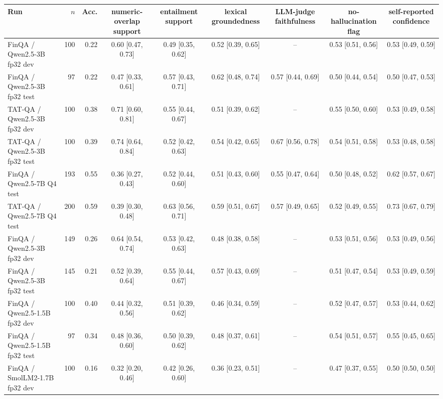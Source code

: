 \begin{tabular}{@{}l r r cccccc@{}}
\toprule
Run & $n$ & Acc. & numeric-overlap support & entailment support & lexical groundedness & LLM-judge faithfulness & no-hallucination flag & self-reported confidence \\
\midrule
FinQA / Qwen2.5-3B fp32 dev & 100 & 0.22 & 0.60 \small[0.47, 0.73] & 0.49 \small[0.35, 0.62] & 0.52 \small[0.39, 0.65] & -- & 0.53 \small[0.51, 0.56] & 0.53 \small[0.49, 0.59] \\
FinQA / Qwen2.5-3B fp32 test & 97 & 0.22 & 0.47 \small[0.33, 0.61] & 0.57 \small[0.43, 0.71] & 0.62 \small[0.48, 0.74] & 0.57 \small[0.44, 0.69] & 0.50 \small[0.44, 0.54] & 0.50 \small[0.47, 0.53] \\
TAT-QA / Qwen2.5-3B fp32 dev & 100 & 0.38 & 0.71 \small[0.60, 0.81] & 0.55 \small[0.44, 0.67] & 0.51 \small[0.39, 0.62] & -- & 0.55 \small[0.50, 0.60] & 0.53 \small[0.49, 0.58] \\
TAT-QA / Qwen2.5-3B fp32 test & 100 & 0.39 & 0.74 \small[0.64, 0.84] & 0.52 \small[0.42, 0.63] & 0.54 \small[0.42, 0.65] & 0.67 \small[0.56, 0.78] & 0.54 \small[0.51, 0.58] & 0.53 \small[0.48, 0.58] \\
FinQA / Qwen2.5-7B Q4 test & 193 & 0.55 & 0.36 \small[0.27, 0.43] & 0.52 \small[0.44, 0.60] & 0.51 \small[0.43, 0.60] & 0.55 \small[0.47, 0.64] & 0.50 \small[0.48, 0.52] & 0.62 \small[0.57, 0.67] \\
TAT-QA / Qwen2.5-7B Q4 test & 200 & 0.59 & 0.39 \small[0.30, 0.48] & 0.63 \small[0.56, 0.71] & 0.59 \small[0.51, 0.67] & 0.57 \small[0.49, 0.65] & 0.52 \small[0.49, 0.55] & 0.73 \small[0.67, 0.79] \\
FinQA / Qwen2.5-3B fp32 dev & 149 & 0.26 & 0.64 \small[0.54, 0.74] & 0.53 \small[0.42, 0.63] & 0.48 \small[0.38, 0.58] & -- & 0.53 \small[0.51, 0.56] & 0.53 \small[0.49, 0.56] \\
FinQA / Qwen2.5-3B fp32 test & 145 & 0.21 & 0.52 \small[0.39, 0.64] & 0.55 \small[0.44, 0.67] & 0.57 \small[0.43, 0.69] & -- & 0.51 \small[0.47, 0.54] & 0.53 \small[0.49, 0.59] \\
FinQA / Qwen2.5-1.5B fp32 dev & 100 & 0.40 & 0.44 \small[0.32, 0.56] & 0.51 \small[0.39, 0.62] & 0.46 \small[0.34, 0.59] & -- & 0.52 \small[0.47, 0.57] & 0.53 \small[0.44, 0.62] \\
FinQA / Qwen2.5-1.5B fp32 test & 97 & 0.34 & 0.48 \small[0.36, 0.60] & 0.50 \small[0.39, 0.62] & 0.48 \small[0.37, 0.61] & -- & 0.54 \small[0.51, 0.57] & 0.55 \small[0.45, 0.65] \\
FinQA / SmolLM2-1.7B fp32 dev & 100 & 0.16 & 0.32 \small[0.20, 0.46] & 0.42 \small[0.26, 0.60] & 0.36 \small[0.23, 0.51] & -- & 0.47 \small[0.37, 0.55] & 0.50 \small[0.50, 0.50] \\

\end{tabular}
